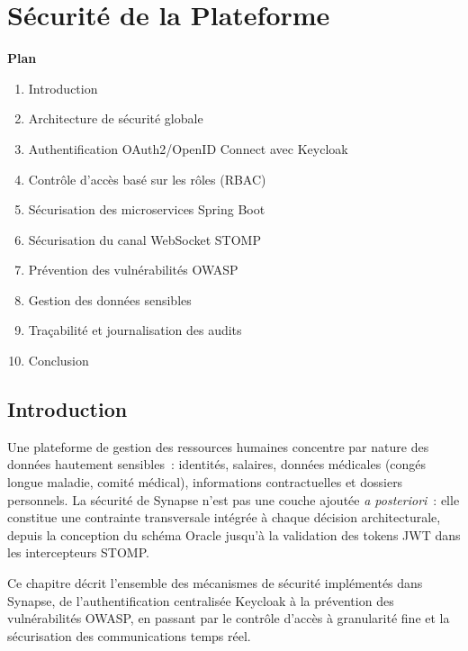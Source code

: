﻿%

\chapter{Sécurité de la Plateforme}

\noindent\textbf{Plan}
\begin{enumerate}
  \item Introduction
  \item Architecture de sécurité globale
  \item Authentification OAuth2/OpenID Connect avec Keycloak
  \item Contrôle d’accès basé sur les rôles (RBAC)
  \item Sécurisation des microservices Spring Boot
  \item Sécurisation du canal WebSocket STOMP
  \item Prévention des vulnérabilités OWASP
  \item Gestion des données sensibles
  \item Traçabilité et journalisation des audits
  \item Conclusion
\end{enumerate}

\section{Introduction}

Une plateforme de gestion des ressources humaines concentre par nature des données
hautement sensibles~: identités, salaires, données médicales (congés longue maladie,
comité médical), informations contractuelles et dossiers personnels. La sécurité de
Synapse n’est pas une couche ajoutée \textit{a posteriori}~: elle constitue une
contrainte transversale intégrée à chaque décision architecturale, depuis la
conception du schéma Oracle jusqu'à la validation des tokens JWT dans les
intercepteurs STOMP.

Ce chapitre décrit l’ensemble des mécanismes de sécurité implémentés dans Synapse,
de l’authentification centralisée Keycloak à la prévention des vulnérabilités OWASP,
en passant par le contrôle d’accès à granularité fine et la sécurisation des
communications temps réel.

